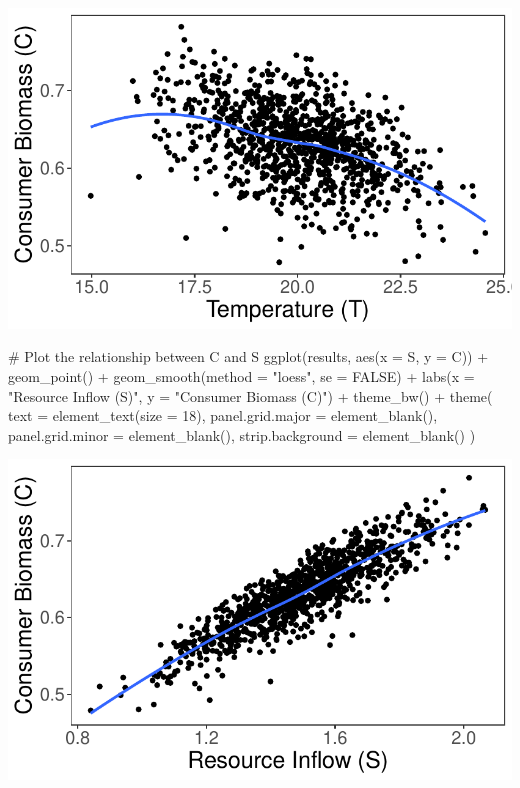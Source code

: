 \documentclass[
  letterpaper,
  DIV=11,
  numbers=noendperiod]{scrartcl}
\newenvironment{Shaded}{\begin{snugshade}}{\end{snugshade}}
\newcommand{\AttributeTok}[1]{\textcolor[rgb]{0.40,0.45,0.13}{#1}}
\newcommand{\CommentTok}[1]{\textcolor[rgb]{0.37,0.37,0.37}{#1}}
\newcommand{\ConstantTok}[1]{\textcolor[rgb]{0.56,0.35,0.01}{#1}}
\newcommand{\DecValTok}[1]{\textcolor[rgb]{0.68,0.00,0.00}{#1}}
\newcommand{\FunctionTok}[1]{\textcolor[rgb]{0.28,0.35,0.67}{#1}}
\newcommand{\NormalTok}[1]{\textcolor[rgb]{0.00,0.23,0.31}{#1}}
\newcommand{\SpecialCharTok}[1]{\textcolor[rgb]{0.37,0.37,0.37}{#1}}
\newcommand{\StringTok}[1]{\textcolor[rgb]{0.13,0.47,0.30}{#1}}
\begin{document}
\includegraphics{index_files/figure-pdf/unnamed-chunk-2-1.pdf}

\begin{Shaded}
\begin{Highlighting}[]
\CommentTok{\# Plot the relationship between C and S}
\FunctionTok{ggplot}\NormalTok{(results, }\FunctionTok{aes}\NormalTok{(}\AttributeTok{x =}\NormalTok{ S, }\AttributeTok{y =}\NormalTok{ C)) }\SpecialCharTok{+}
    \FunctionTok{geom\_point}\NormalTok{() }\SpecialCharTok{+}
    \FunctionTok{geom\_smooth}\NormalTok{(}\AttributeTok{method =} \StringTok{"loess"}\NormalTok{, }\AttributeTok{se =} \ConstantTok{FALSE}\NormalTok{) }\SpecialCharTok{+}
    \FunctionTok{labs}\NormalTok{(}\AttributeTok{x =} \StringTok{"Resource Inflow (S)"}\NormalTok{, }\AttributeTok{y =} \StringTok{"Consumer Biomass (C)"}\NormalTok{) }\SpecialCharTok{+}
    \FunctionTok{theme\_bw}\NormalTok{() }\SpecialCharTok{+}
    \FunctionTok{theme}\NormalTok{(}
        \AttributeTok{text =} \FunctionTok{element\_text}\NormalTok{(}\AttributeTok{size =} \DecValTok{18}\NormalTok{),}
        \AttributeTok{panel.grid.major =} \FunctionTok{element\_blank}\NormalTok{(),}
        \AttributeTok{panel.grid.minor =} \FunctionTok{element\_blank}\NormalTok{(),}
        \AttributeTok{strip.background =} \FunctionTok{element\_blank}\NormalTok{()}
\NormalTok{    )}
\end{Highlighting}
\end{Shaded}

\includegraphics{index_files/figure-pdf/unnamed-chunk-2-2.pdf}
\end{document}

